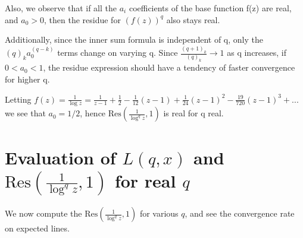 \documentclass[a4paper,11pt,twoside]{amsart}
\newcommand\Res{\mathrm{Res}}
\begin{document}
Also, we observe that if all the $a_i$ coefficients of the base function f(z) are real, and $a_0 > 0$, then the residue for $(f(z))^q$ also stays real. 

Additionally, since the inner sum formula is independent of q, only the $(q)_k a_{0}^{(q-k)}$ terms change on varying q. Since $\frac{(q+1)_k}{(q)_k} \to 1$ as q increases, if $0 < a_0 < 1$, the residue expression should have a tendency of faster convergence for higher q. 

Letting $f(z) = \frac{1}{\log z} = \frac{1}{z-1} + \frac{1}{2} - \frac{1}{12} (z-1) + \frac{1}{24}(z-1)^2 - \frac{19}{720}(z-1)^3 + ...$ we see that $a_0 = 1/2$, hence $\Res(\frac{1}{\log^{q} z},1)$ is real for q real.

\section{Evaluation of $L(q,x)$ and $\Res(\frac{1}{\log^{q} z},1)$ for real $q$}

We now compute the $\Res(\frac{1}{\log^{q} z},1)$ for various $q$, and see the convergence rate on expected lines.
\end{document}

